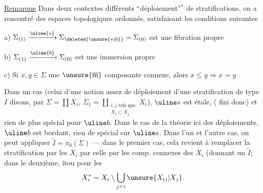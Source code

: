 \uline{Remarque} Dans deux contextes différents
``déploiement''$^{*}$ de  stratifications, on
a rencontré des espaces topologiques ordonnés\inserted{$\Sigma$},
satisfaisant les conditions suivantes


a) $\Sigma_{(1)}\xrightarrow{\uline{s}}\Sigma_{\deleted{\unsure{*|0}}}=\Sigma_{(0)}$
est une fibration propre

b) $\Sigma_{(1)}\xrightarrow{\uline{b}}\Sigma_{(0)}$ est une immersion propre

c) Si $x,y\in\Sigma$   une $\unsure{\overline{\mathrm m}}$ composante connexe,
alors $x\leq y\Longrightarrow x=y$


Dans un cas (celui d'une notion assez 
 de déploiement d'une stratification de type $I$ disons,
par $\Sigma=\coprod X_i$,
$\Sigma_1=\displaystyle\coprod_{\substack{i,j\text{ tels que}\\X_i\subset X_j}}X_i$),
$\uline s$ est étale, ( fini donc) et rien de plus spécial pour $\uline b$.
Dans le cas de la théorie 
ici des déploiements,
$\uline b$ est bordant, rien de spécial sur $\uline s$.
Dans l'un et l'autre cas, on peut appliquer  
 $\widetilde I=\pi_0(\Sigma)$ --- dans le premier cas,
cela revient à remplacer la stratification par les $X_i$ par celle
par les comp. connexes des $X_i$ (donnant un $\widetilde I$;
dans le deuxième,
itou pour les
\[
X_i^{*}=X_i\setminus\bigcup_{j<i}\unsure{X_{ij}|X_j}.
\]
